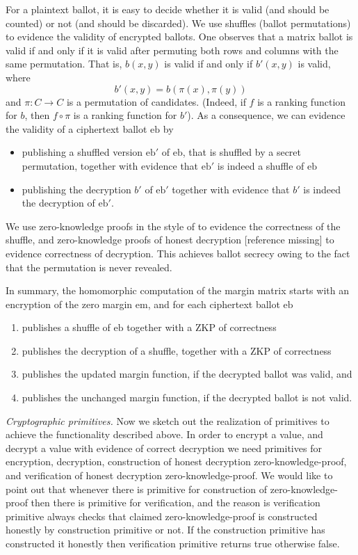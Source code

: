 \documentclass{llncs}
\newcommand{\encb}{\mathrm{eb}}
\newcommand{\encm}{\mathrm{em}}
\begin{document}
For a plaintext ballot, it is easy to decide whether it is
valid (and should be counted) or not (and should be discarded). We
use shuffles (ballot permutations) to evidence the validity of
encrypted ballots. One observes that a matrix ballot is valid if and
only if it is valid after permuting both rows and columns with the
same permutation. That is, $b(x,y)$ is valid if and only if $b'(x,y)$
is valid, where
\[ b'(x,y) = b(\pi(x), \pi(y)) \]
and $\pi: C \to C$ is a permutation of candidates. (Indeed, if $f$
is a ranking function for $b$, then $f \circ \pi$ is a ranking
function for $b'$). As a consequence, we can evidence the validity
of a ciphertext ballot $\encb$ by
\begin{itemize}
  \item publishing a shuffled version $\encb'$ of $\encb$, that is
  shuffled by a secret permutation, together with
  evidence that $\encb'$ is indeed a shuffle of $\encb$
  \item publishing the decryption $b'$ of $\encb'$ together with
  evidence that $b'$ is indeed the decryption of $\encb'$.
\end{itemize}

We use zero-knowledge proofs in the style of \cite{Bayer:2012:EZK}
to evidence the correctness of the shuffle, and zero-knowledge
proofs of honest decryption [reference missing] to evidence
correctness of decryption. This achieves ballot secrecy owing to the
fact that the permutation is never revealed.


In summary, the homomorphic computation of the margin matrix starts
with an encryption of the zero margin $\encm$, and for each
ciphertext ballot $\encb$
\begin{enumerate}
\item publishes a shuffle of $\encb$ together with a ZKP of 
correctness
\item publishes the decryption of a shuffle, together with a ZKP of
correctness
\item publishes the updated margin function, if the decrypted ballot
was valid, and
\item publishes the unchanged margin function, if the decrypted
ballot is not valid.
\end{enumerate}

\smallskip\noindent\emph{Cryptographic primitives.} Now we sketch out the 
realization of primitives to achieve the functionality described above. 
In order to encrypt a value, and decrypt a value with 
evidence of correct decryption we need primitives for encryption, 
decryption, construction of
honest decryption zero-knowledge-proof, and verification of 
honest decryption zero-knowledge-proof. We would like to point out 
that whenever there is primitive for construction of zero-knowledge-proof 
then there is primitive for verification, and the reason is verification 
primitive always checks that claimed zero-knowledge-proof is constructed 
honestly by construction primitive or not. If the construction primitive has 
constructed it honestly then verification primitive 
returns true otherwise false. 
\end{document}
